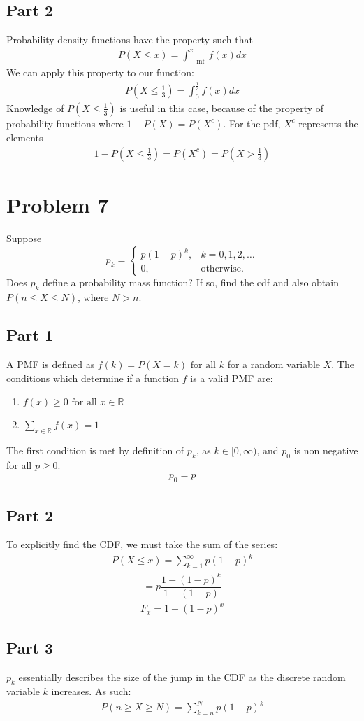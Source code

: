 \documentclass{article}
\begin{document}
\subsection*{Part 2}
Probability density functions have the property such that                                                                     
\begin{align*}
P(X\leq x) = \int_{-\inf}^{x} f(x)dx
\end{align*}
We can apply this property to our function:
\begin{align*}
P(X\leq \frac{1}{3}) = \int_{0}^{\frac{1}{3}} f(x)dx
\end{align*}
Knowledge of $P(X\leq \frac{1}{3})$ is useful in this case, because of the property of probability functions where $1-P(X)=P(X^c)$. For the pdf, $X^c$ represents the elements
\begin{align*}
\boxed{1-P(X\leq \frac{1}{3}) = P(X^c) = P(X > \frac{1}{3})}
\end{align*}
\clearpage
\section*{Problem 7}
Suppose
    \[
    p_k = \begin{cases} p(1-p)^k , & k = 0,1,2,\dots \\ 0 , &  \text{otherwise}.\end{cases} 
    \]
    Does $p_k$ define a probability mass function? If so, find the cdf and also obtain $P(n\le X \le N)$, where $N>n$.
\subsection*{Part 1}
A PMF is defined as $f(k)=P(X=k)\text{ for all }k$ for a random variable $X$. The conditions which determine if a function $f$ is a valid PMF are:
\begin{enumerate}
\item
$f(x) \geq 0 \text{ for all }x \in \mathbb{R}$
\item
$\sum_{x\in \mathbb{R}} f(x) = 1$
\end{enumerate}
The first condition is met by definition of $p_k$, as $k\in [0,\infty)$, and $p_0$ is non negative for all $p\geq 0$.
\begin{align*}
p_0 = p
\end{align*}

\subsection{Part 2}
To explicitly find the CDF, we must take the sum of the series:
\begin{align*}
P(X\leq x) = \sum_{k=1}^{\infty}p(1-p)^k
\end{align*}
\begin{align*}
 = p\dfrac{1-(1-p)^k}{1-(1-p)}
\end{align*}
\begin{align*}
\boxed{F_x = 1-(1-p)^x}
\end{align*}



\subsection{Part 3}
$p_k$ essentially describes the size of the jump in the CDF as the discrete random variable $k$ increases. As such:
\begin{align*}
\boxed{P(n\geq X \geq N) = \sum_{k=n}^{N}p(1-p)^k}
\end{align*}
\end{document}
